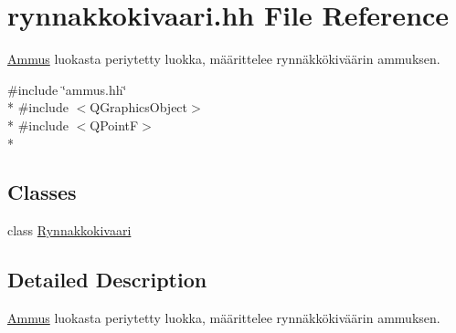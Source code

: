 \hypertarget{rynnakkokivaari_8hh}{\section{rynnakkokivaari.\-hh File Reference}
\label{rynnakkokivaari_8hh}
}


\hyperlink{class_ammus}{Ammus} luokasta periytetty luokka, määrittelee rynnäkkökiväärin ammuksen.  


{\ttfamily \#include \char`\"{}ammus.\-hh\char`\"{}}\\*
{\ttfamily \#include $<$Q\-Graphics\-Object$>$}\\*
{\ttfamily \#include $<$Q\-Point\-F$>$}\\*
\subsection*{Classes}
\begin{DoxyCompactItemize}
\item 
class \hyperlink{class_rynnakkokivaari}{Rynnakkokivaari}
\end{DoxyCompactItemize}


\subsection{Detailed Description}
\hyperlink{class_ammus}{Ammus} luokasta periytetty luokka, määrittelee rynnäkkökiväärin ammuksen. 